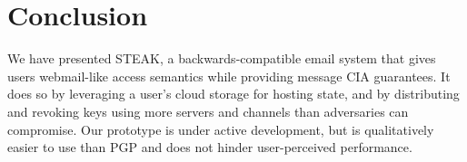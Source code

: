 \section{Conclusion}
\label{sec:conclusion}

We have presented STEAK, a backwards-compatible email system that gives users 
webmail-like access semantics while providing message CIA guarantees.  It does so
by leveraging a user's cloud storage for hosting state, and by distributing and revoking
keys using more servers and channels than adversaries can compromise.  Our prototype
is under active development, but is qualitatively easier to use than PGP and does 
not hinder user-perceived performance.
